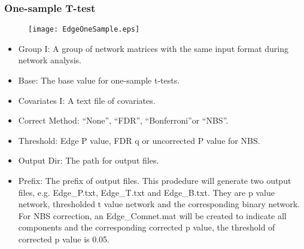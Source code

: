 \documentclass[11pt]{article}
\begin{document}
            \subsubsection{One-sample T-test}
				\begin{figure}
					\begin{center}
						\texttt{[image: EdgeOneSample.eps]}
					\end{center}
				\end{figure}
                \begin{itemize}
                    \item Group I: A group of network matrices with the same input format 
                        during network analysis.
                    \item Base: The base value for one-sample t-tests.
                    \item Covariates I: A text file of covariates.
                    \item Correct Method: ``None'', ``FDR'', ``Bonferroni''or ``NBS''.
                    \item Threshold: Edge P value, FDR q or uncorrected P value for NBS.
                    \item Output Dir: The path for output files.
                    \item Prefix: The prefix of output files. This prodedure will generate
                        two output files, e.g. Edge\_P.txt, Edge\_T.txt and Edge\_B.txt. 
                        They are p value network, thresholded t value network and the 
                        corresponding binary network. For NBS correction, an Edge\_Comnet.mat
                        will be created to indicate all components and the corresponding 
                        corrected p value, the threshold of corrected p value is 0.05.
                \end{itemize}
\end{document}
